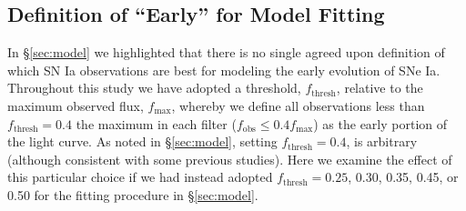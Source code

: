 \documentclass[twocolumn]{./aastex63}
\begin{document}
\subsection{Definition of ``Early'' for Model Fitting}\label{sec:flux_cut}

In \S\ref{sec:model} we highlighted that there is no single agreed upon
definition of which SN Ia observations are best for modeling the early
evolution of SNe Ia. Throughout this study we have adopted a threshold,
$f_\mathrm{thresh}$, relative to the maximum observed flux, $f_\mathrm{max}$,
whereby we define all observations less than $f_\mathrm{thresh} = 0.4$ the
maximum in each filter ($f_\mathrm{obs} \leq 0.4f_\mathrm{max}$) as the early
portion of the light curve. As noted in \S\ref{sec:model}, setting
$f_\mathrm{thresh} = 0.4$, is arbitrary (although consistent with some
previous studies). Here we examine the effect of this particular choice if we
had instead adopted $f_\mathrm{thresh} = 0.25$, 0.30, 0.35, 0.45, or 0.50 for
the fitting procedure in \S\ref{sec:model}.
\end{document}
